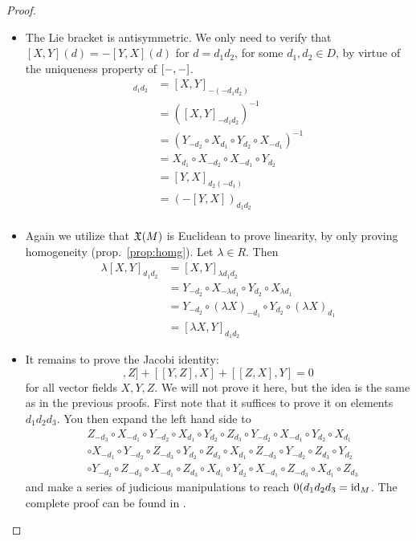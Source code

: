 \begin{proof}
  \begin{itemize}
    \item The Lie bracket is antisymmetric. We only need to verify that \( [X,Y](d) = -[Y,X](d) \) for \( d = d_1d_2 \), for some \( d_1,d_2\in D \), by virtue of the uniqueness property of \( [-,-] \).
      \begin{align*}
	[X,Y]_{d_1d_2} &= [X,Y]_{-(-d_1d_2)}                                                   \\
		       &= \left( [X,Y]_{-d_1d_2} \right)^{-1}                                  \\
		       &= \left( Y_{-d_2}\circ X_{d_1}\circ Y_{d_2}\circ X_{-d_1} \right)^{-1} \\
		       &= X_{d_1}\circ X_{-d_2}\circ X_{-d_1}\circ Y_{d_2}                     \\
		       &= [Y,X]_{d_2(-d_1)}                                                    \\
		       &= \left( -[Y,X] \right)_{d_1d_2}                                       \\
      \end{align*}
    \item Again we utilize that \( \mathfrak X(M) \) is Euclidean to prove linearity, by only proving homogeneity (prop.\ \ref{prop:homg}). Let \( \lambda\in R \). Then
      \begin{align*}
	\lambda[X,Y]_{d_1d_2} &= [X,Y]_{\lambda d_1d_2}                                               \\
	                      &= Y_{-d_2}\circ X_{-\lambda d_1}\circ Y_{d_2}\circ X_{\lambda d_1}     \\
			      &= Y_{-d_2}\circ (\lambda X)_{-d_1}\circ Y_{d_2}\circ (\lambda X)_{d_1} \\
			      &= [\lambda X,Y]_{d_1d_2}
      \end{align*}
    \item It remains to prove the Jacobi identity:
      \begin{equation*}
	[[X,Y],Z] + [[Y,Z],X] + [[Z,X],Y] = 0
      \end{equation*}
      for all vector fields \( X,Y,Z \). We will not prove it here, but the idea is the same as in the previous proofs. First note that it suffices to prove it on elements \( d_1d_2d_3 \). You then expand the left hand side to
      \begin{align*}
	&Z_{-d_3}\circ X_{-d_1}\circ Y_{-d_2}\circ X_{d_1}\circ Y_{d_2}\circ Z_{d_3}\circ Y_{-d_2}\circ X_{-d_1}\circ Y_{d_2}\circ X_{d_1} \\
        &\circ X_{-d_1}\circ Y_{-d_2}\circ Z_{-d_3}\circ Y_{d_2}\circ Z_{d_3}\circ X_{d_1}\circ Z_{-d_3}\circ Y_{-d_2}\circ Z_{d_3}\circ Y_{d_2} \\
        &\circ Y_{-d_2}\circ Z_{-d_3}\circ X_{-d_1}\circ Z_{d_3}\circ X_{d_1}\circ Y_{d_2}\circ X_{-d_1}\circ Z_{-d_3}\circ X_{d_1}\circ Z_{d_3} 
      \end{align*}
      and make a series of judicious manipulations to reach \( 0(d_1d_2d_3 = \operatorname{id}_M \). The complete proof can be found in \cite{lav96}.
  \end{itemize}
\end{proof}

